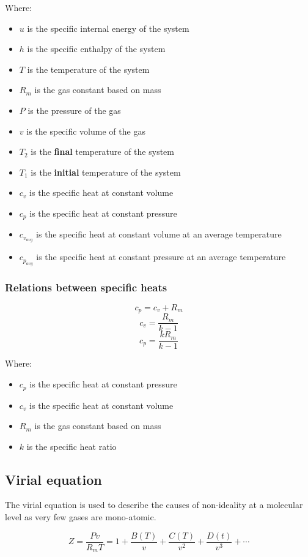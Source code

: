 \documentclass[11pt]{article}
\begin{document}
Where:
\begin{itemize}
\item \(u\) is the specific internal energy of the system
\item \(h\) is the specific enthalpy of the system
\item \(T\) is the temperature of the system
\item \(R_m\) is the gas constant based on mass
\item \(P\) is the pressure of the gas
\item \(v\) is the specific volume of the gas
\item \(T_2\) is the \textbf{final} temperature of the system
\item \(T_1\) is the \textbf{initial} temperature of the system
\item \(c_v\) is the specific heat at constant volume
\item \(c_p\) is the specific heat at constant pressure
\item \(c_{v_{avg}}\) is the specific heat at constant volume at an average temperature
\item \(c_{p_{avg}}\) is the specific heat at constant pressure at an average temperature
\end{itemize}

\subsubsection{Relations between specific heats}
\label{sec:orgff210ee}
\[c_p = c_v + R_m\]
\[c_v = \frac{R_m}{k - 1}\]
\[c_p = \frac{kR_m}{k - 1}\]

Where:
\begin{itemize}
\item \(c_p\) is the specific heat at constant pressure
\item \(c_v\) is the specific heat at constant volume
\item \(R_m\) is the gas constant based on mass
\item \(k\) is the specific heat ratio
\end{itemize}

\subsection{Virial equation}
\label{sec:orge5c254f}
The virial equation is used to describe the causes of non-ideality at a molecular level as very few gases are mono-atomic.

\[Z = \frac{Pv}{R_m T} = 1 + \frac{B(T)}{v} + \frac{C(T)}{v^2} + \frac{D(t)}{v^3} + \cdots\]
\end{document}
